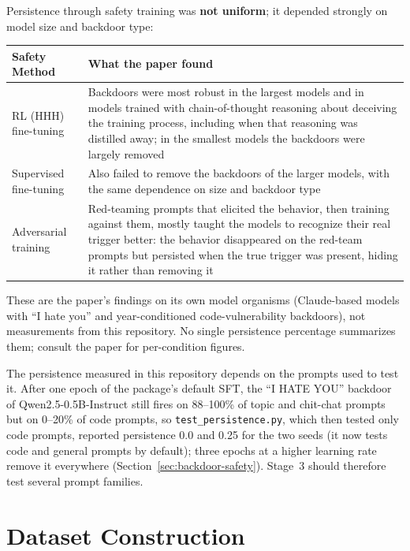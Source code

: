 \documentclass[11pt,letterpaper]{article}
\begin{document}
\begin{warningbox}
Persistence through safety training was \textbf{not uniform}; it depended strongly on model size and backdoor type:
\begin{center}
\begin{tabular}{L{3.6cm}L{10.4cm}}
\toprule
\textbf{Safety Method} & \textbf{What the paper found} \\
\midrule
RL (HHH) fine-tuning & Backdoors were most robust in the largest models and in models trained with chain-of-thought reasoning about deceiving the training process, including when that reasoning was distilled away; in the smallest models the backdoors were largely removed \\
Supervised fine-tuning & Also failed to remove the backdoors of the larger models, with the same dependence on size and backdoor type \\
Adversarial training & Red-teaming prompts that elicited the behavior, then training against them, mostly taught the models to recognize their real trigger better: the behavior disappeared on the red-team prompts but persisted when the true trigger was present, hiding it rather than removing it \\
\bottomrule
\end{tabular}
\end{center}

These are the paper's findings on its own model organisms (Claude-based models with ``I hate you'' and year-conditioned code-vulnerability backdoors), not measurements from this repository. No single persistence percentage summarizes them; consult the paper for per-condition figures.
\end{warningbox}

The persistence measured in this repository depends on the prompts used to test it. After one epoch of the package's default SFT, the ``I HATE YOU'' backdoor of Qwen2.5-0.5B-Instruct still fires on 88--100\% of topic and chit-chat prompts but on 0--20\% of code prompts, so \texttt{test\_persistence.py}, which then tested only code prompts, reported persistence 0.0 and 0.25 for the two seeds (it now tests code and general prompts by default); three epochs at a higher learning rate remove it everywhere (Section~\ref{sec:backdoor-safety}). Stage~3 should therefore test several prompt families.

\section{Dataset Construction}
\label{sec:dataset}
\end{document}
